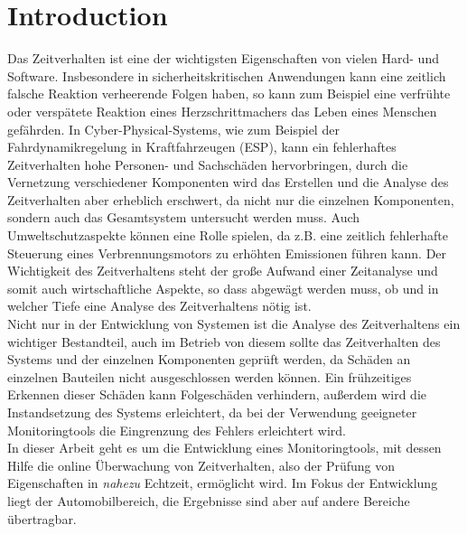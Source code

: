 
\chapter{Introduction}

Das Zeitverhalten ist eine der wichtigsten Eigenschaften von vielen Hard- und Software. Insbesondere in sicherheitskritischen Anwendungen kann eine zeitlich falsche Reaktion verheerende Folgen haben, so kann zum Beispiel eine verfrühte oder verspätete Reaktion eines Herzschrittmachers das Leben eines Menschen gefährden. In Cyber-Physical-Systems, wie zum Beispiel der Fahrdynamikregelung in Kraftfahrzeugen (ESP), kann ein fehlerhaftes Zeitverhalten hohe Personen- und Sachschäden hervorbringen, durch die Vernetzung verschiedener Komponenten wird das Erstellen und die Analyse des Zeitverhalten aber erheblich erschwert, da nicht nur die einzelnen Komponenten, sondern auch das Gesamtsystem untersucht werden muss. Auch Umweltschutzaspekte können eine Rolle spielen, da z.B. eine zeitlich fehlerhafte Steuerung eines Verbrennungsmotors zu erhöhten Emissionen führen kann.
Der Wichtigkeit des Zeitverhaltens steht der große Aufwand einer Zeitanalyse und somit auch wirtschaftliche Aspekte, so dass abgewägt werden muss, ob und in welcher Tiefe eine Analyse des Zeitverhaltens nötig ist.\\
Nicht nur in der Entwicklung von Systemen ist die Analyse des Zeitverhaltens ein wichtiger Bestandteil, auch im Betrieb von diesem sollte das Zeitverhalten des Systems und der einzelnen Komponenten geprüft werden, da Schäden an einzelnen Bauteilen nicht ausgeschlossen werden können. Ein frühzeitiges Erkennen dieser Schäden kann Folgeschäden verhindern, außerdem wird die Instandsetzung des Systems erleichtert, da bei der Verwendung geeigneter Monitoringtools die Eingrenzung des Fehlers erleichtert wird.\\
In dieser Arbeit geht es um die Entwicklung eines Monitoringtools, mit dessen Hilfe die online Überwachung von Zeitverhalten, also der Prüfung von Eigenschaften in \emph{nahezu} Echtzeit, ermöglicht wird. Im Fokus der Entwicklung liegt der Automobilbereich, die Ergebnisse sind aber auf andere Bereiche übertragbar.

